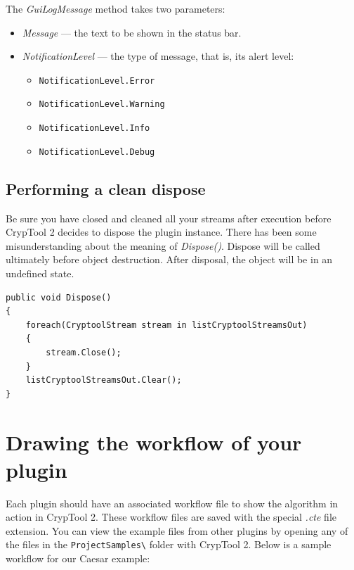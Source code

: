 The \textit{GuiLogMessage} method takes two parameters:

\begin{itemize}
	\item \textit{Message} --- the text to be shown in the status bar.
	\item \textit{NotificationLevel} --- the type of message, that is, its alert level:
	\begin{itemize}
		\item \texttt{NotificationLevel.Error}
		\item \texttt{NotificationLevel.Warning}
		\item \texttt{NotificationLevel.Info}
		\item \texttt{NotificationLevel.Debug}
	\end{itemize}
\end{itemize}

\subsection{Performing a clean dispose}

Be sure you have closed and cleaned all your streams after execution before CrypTool 2 decides to dispose the plugin instance. There has been some misunderstanding about the meaning of \textit{Dispose()}. Dispose will be called ultimately before object destruction. After disposal, the object will be in an undefined state.

\begin{lstlisting}
public void Dispose()
{
	foreach(CryptoolStream stream in listCryptoolStreamsOut)
	{
		stream.Close();
	}
	listCryptoolStreamsOut.Clear();
}
\end{lstlisting}

\section{Drawing the workflow of your plugin}
\label{DrawingTheWorkfloweOfYourPlugin}

Each plugin should have an associated workflow file to show the algorithm in action in CrypTool 2. These workflow files are saved with the special \textit{.cte} file extension. You can view the example files from other plugins by opening any of the files in the \texttt{ProjectSamples\textbackslash} folder with CrypTool 2. Below is a sample workflow for our Caesar example:

